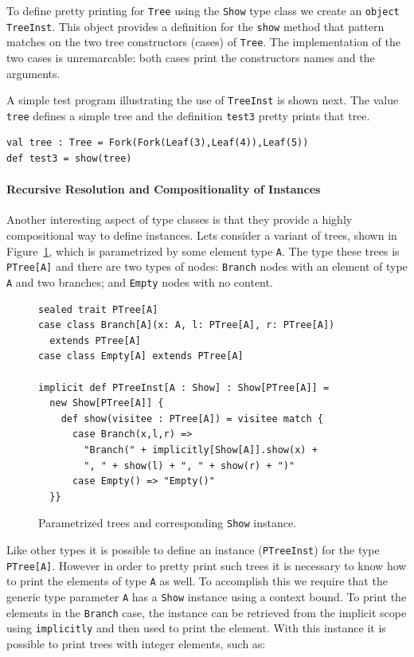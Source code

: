 \documentclass[preprint,nocopyrightspace]{sigplanconf}
\begin{document}
To define pretty printing for \lstinline{Tree} using the
\lstinline{Show} type class we create an \lstinline{object TreeInst}.
This object provides a definition for the
\lstinline{show} method that pattern matches on the
two tree constructors (cases) of \lstinline{Tree}. The implementation
of the two cases is unremarcable: both cases print the
constructors names and the arguments.

A simple test program illustrating the use of \lstinline{TreeInst}
is shown next. The value \lstinline{tree} defines a simple tree and the
definition \lstinline{test3} pretty prints that tree.

\begin{lstlisting}
val tree : Tree = Fork(Fork(Leaf(3),Leaf(4)),Leaf(5))
def test3 = show(tree)
\end{lstlisting}

\paragraph{Recursive Resolution and Compositionality of Instances}
Another interesting aspect of type classes is that they provide a
highly compositional way to define instances.
Lets consider a variant of trees, shown in Figure~\ref{fig:ptrees}, which is
parametrized by some element type \lstinline{A}. The type these trees
is \lstinline{PTree[A]} and there are two types of nodes:
\lstinline{Branch} nodes with an element of type \lstinline{A}
and two branches; and \lstinline{Empty} nodes with no content.

\begin{figure}
\begin{lstlisting}
sealed trait PTree[A]
case class Branch[A](x: A, l: PTree[A], r: PTree[A])
  extends PTree[A]
case class Empty[A] extends PTree[A]

implicit def PTreeInst[A : Show] : Show[PTree[A]] =
  new Show[PTree[A]] {
    def show(visitee : PTree[A]) = visitee match {
      case Branch(x,l,r) =>
        "Branch(" + implicitly[Show[A]].show(x) +
        ", " + show(l) + ", " + show(r) + ")"
      case Empty() => "Empty()"
  }}
\end{lstlisting}
\caption{Parametrized trees and corresponding \lstinline{Show}
  instance.}
\label{fig:ptrees}
\end{figure}

Like other types it is possible to define an instance (\lstinline{PTreeInst})
for the type \lstinline{PTree[A]}. However in order to pretty print
such trees it is necessary to know how to print the elements of type
\lstinline{A} as well. To accomplish this we require that the
generic type parameter \lstinline{A} has a \lstinline{Show} instance
using a context bound.  To print the elements in the
\lstinline{Branch} case, the instance can be retrieved from the implicit
scope using \lstinline{implicitly} and then used to print the element.
With this instance it is possible to print trees with integer elements, such as:
\end{document}
